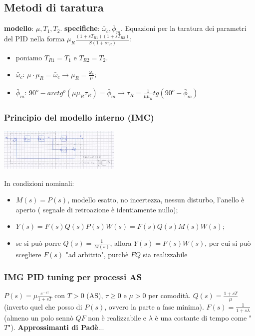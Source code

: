\begin{landscape}
\begin{multicols*}{3}
    \subsection*{Metodi di taratura}
    \textbf{modello}: $\mu, T_1, T_2$.\newline
    \textbf{specifiche}: $\bar{\omega}_c, \bar{\phi}_m$.\newline
    \newline
    Equazioni per la taratura dei parametri del PID nella forma $\mu_R \frac{(1+sT_{R1}) (1+sT_{R2})}{S (1+s \tau_R)}$:
    \begin{itemize}
        \item poniamo $T_{R1} = T_1$ e $T_{R2} = T_2$.
        \item $\bar{\omega}_c$: $\mu \cdot \mu_R = \bar{\omega}_c \rightarrow \mu_R = \frac{\bar{\omega}_c}{\mu}$;
        \item $\bar{\phi}_m$: $90^o - arctg^o(\mu \mu_R \tau_R) = \bar{\phi}_m \rightarrow \tau_R = \frac{1}{\mu \mu_R} tg(90^o - \bar{\phi}_m)$  
    \end{itemize}
    \subsubsection*{Principio del modello interno (IMC)}
    \begin{center}
        \includegraphics[height=2cm]{../formulario/img6.JPG}
    \end{center}
    In condizioni nominali:
    \begin{itemize}
        \item $M(s) = P(s)$, modello esatto, no incertezza, nessun disturbo, l'anello è aperto ( segnale di retroazione è identiamente nullo);
        \item $Y(s) = F(s)Q(s)P(s)W(s) = F(s) Q(s)M(s)W(s)$;
        \item se si può porre $Q(s) = \frac{1}{M(s)}$, allora $Y(s) = F(s) W(s)$, per cui si può scegliere $F(s)$ "ad arbitrio", purchè $FQ$ sia realizzabile
    \end{itemize}
    \subsubsection*{IMG PID tuning per processi AS}
    $P(s) = \mu \frac{e^{-s \tau}}{1+s T}$ con $T> 0$ (AS), $\tau \geq 0$ e $\mu > 0$ per comodità.\newline
    $Q(s) = \frac{1 + s T}{\mu}$ (inverto quel che posso di $P(s)$, ovvero la parte a fase minima).\newline
    $F(s) = \frac{1}{1+s \lambda}$ (almeno un polo sennò $QF$ non è realizzabile e $\lambda$ è una costante di tempo come "$T$").\newline
    \newline
    \textbf{Approssimanti di Padè}...

\end{multicols*}
\end{landscape}
